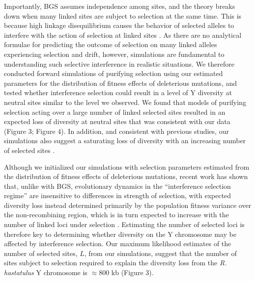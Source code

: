 \documentclass[9pt,twocolumn,twoside]{gsajnl}
\begin{document}
Importantly, BGS assumes independence among sites, and the theory breaks down when many linked sites are subject to selection at the same time. This is because high linkage disequilibrium causes the behavior of selected alleles to interfere with the action of selection at linked sites \citep{good2014genetic,KaiserCharlesworth}. As there are no analytical formulae for predicting the outcome of selection on many linked alleles experiencing selection and drift, however, simulations are fundamental to understanding such selective interference in realistic situations. We therefore conducted forward simulations of purifying selection using our estimated parameters for the distribution of fitness effects of deleterious mutations, and tested whether interference selection could result in a level of Y diversity at neutral sites similar to the level we observed. We found that models of purifying selection acting over a large number of linked selected sites resulted in an expected loss of diversity at neutral sites that was consistent with our data (Figure 3; Figure 4). In addition, and consistent with previous studies, our simulations also suggest a saturating loss of diversity with an increasing number of selected sites \citep{KaiserCharlesworth}.

Although we initialized our simulations with selection parameters estimated from the distribution of fitness effects of deleterious mutations, recent work has shown that, unlike with BGS, evolutionary dynamics in the “interference selection regime” are insensitive to differences in strength of selection, with expected diversity loss instead determined primarily by the population fitness variance over the non-recombining region, which is in turn expected to increase with the number of linked loci under selection \citep{good2014genetic}. Estimating the number of selected loci is therefore key to determining whether diversity on the Y chromosome may be affected by interference selection. Our maximum likelihood estimates of the number of selected sites, $L$, from our simulations, suggest that the number of sites subject to selection required to explain the diversity loss from the \textit{R. hastatulus} Y chromosome is $\approx 800$ kb (Figure 3).
\end{document}
